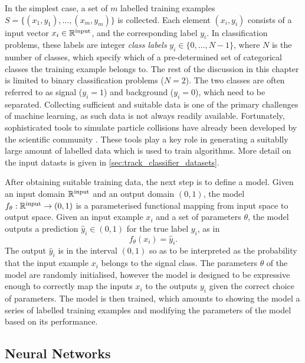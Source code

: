 In the simplest case, a set of $m$ labelled training examples $S = \{ (x_1, y_1) , \ldots , (x_m, y_m) \}$ is collected.
Each element $(x_i, y_i)$ consists of a input vector $x_i  \in \mathbb{R}^{\textnormal{input}}$, and the corresponding label $y_i$.
In classification problems, these labels are integer \textit{class labels} $y_i \in \{0,\ldots,N-1\}$, where $N$ is the number of classes, which specify which of a pre-determined set of categorical classes the training example belongs to.
The rest of the discussion in this chapter is limited to binary classification problems ($N = 2$).
The two classes are often referred to as signal ($y_i = 1$) and background ($y_i = 0$), which need to be separated.
Collecting sufficient and suitable data is one of the primary challenges of machine learning, as such data is not always readily available.
Fortunately, sophisticated tools to simulate particle collisions have already been developed by the scientific community \cite{leshouchesaccords, leshouchesstandardisation}.
These tools play a key role in generating a suitablly large amount of labelled data which is used to train algorithms.
More detail on the input datasts is given in \cref{sec:track_classifier_datasets}.

After obtaining suitable training data, the next step is to define a model.
Given an input domain $\mathbb{R}^{\textnormal{input}}$ and an output domain $(0, 1)$, the model
$f_\theta: \mathbb{R}^{\textnormal{input}} \to (0, 1)$ is a parameterised functional mapping from input space to output space.
Given an input example $x_i$ and a set of parameters $\theta$, the model outputs a prediction $\hat{y}_i \in (0, 1)$ for the true label $y_i$, as in
%
\begin{equation}
    f_\theta(x_i) = \hat{y}_i .
\end{equation}
%
The output $\hat{y}_i$ is in the interval $(0, 1)$ so as to be interpreted as the probability that the input example $x_i$ belongs to the signal class.
The parameters $\theta$ of the model are randomly initialised, however the model is designed to be expressive enough to correctly map the inputs $x_i$ to the outputs $y_i$ given the correct choice of parameters.
The model is then trained, which amounts to showing the model a series of labelled training examples and modifying the parameters of the model based on its performance.


\subsection{Neural Networks}\label{sec:neural_nets}

